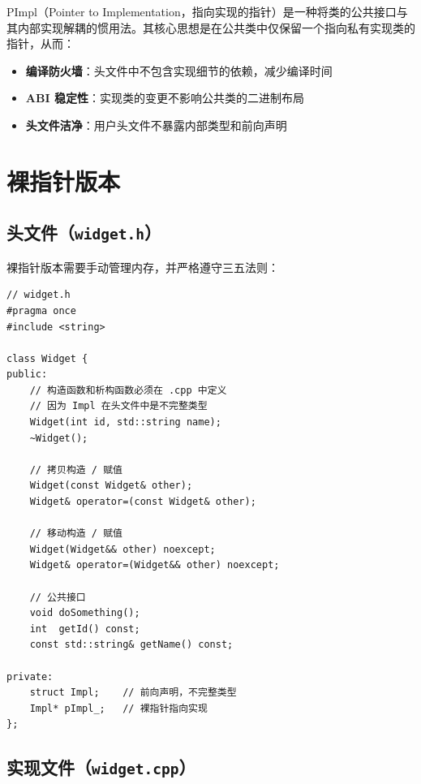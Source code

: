 \documentclass[12pt,a4paper,fontset=fandol]{ctexbook}
\begin{document}
PImpl（Pointer to Implementation，指向实现的指针）是一种将类的公共接口与其内部实现解耦的惯用法。其核心思想是在公共类中仅保留一个指向私有实现类的指针，从而：

\begin{itemize}[leftmargin=2em]
  \item \textbf{编译防火墙}：头文件中不包含实现细节的依赖，减少编译时间
  \item \textbf{ABI 稳定性}：实现类的变更不影响公共类的二进制布局
  \item \textbf{头文件洁净}：用户头文件不暴露内部类型和前向声明
\end{itemize}

\section{裸指针版本}

\subsection{头文件（\texttt{widget.h}）}

裸指针版本需要手动管理内存，并严格遵守三五法则：

\begin{lstlisting}[caption={PImpl 裸指针版——头文件}]
// widget.h
#pragma once
#include <string>

class Widget {
public:
    // 构造函数和析构函数必须在 .cpp 中定义
    // 因为 Impl 在头文件中是不完整类型
    Widget(int id, std::string name);
    ~Widget();

    // 拷贝构造 / 赋值
    Widget(const Widget& other);
    Widget& operator=(const Widget& other);

    // 移动构造 / 赋值
    Widget(Widget&& other) noexcept;
    Widget& operator=(Widget&& other) noexcept;

    // 公共接口
    void doSomething();
    int  getId() const;
    const std::string& getName() const;

private:
    struct Impl;    // 前向声明，不完整类型
    Impl* pImpl_;   // 裸指针指向实现
};
\end{lstlisting}

\subsection{实现文件（\texttt{widget.cpp}）}
\end{document}
